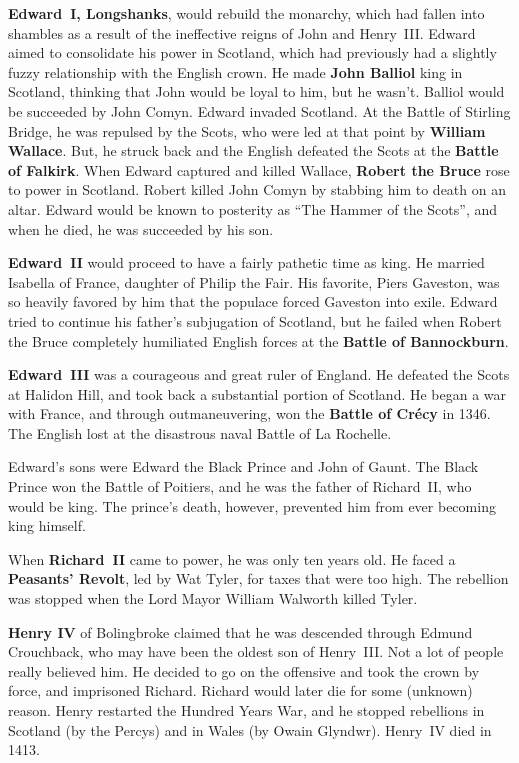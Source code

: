 \textbf{Edward~I, Longshanks}, would rebuild the monarchy,
which had fallen into shambles as a result of the ineffective reigns of John and Henry~III\@.
Edward aimed to consolidate his power in Scotland,
which had previously had a slightly fuzzy relationship with the English crown.
He made \textbf{John Balliol} king in Scotland, thinking that John would be loyal to him, but he wasn't.
Balliol would be succeeded by John Comyn.
Edward invaded Scotland.
At the Battle of Stirling Bridge, he was repulsed by the Scots,
who were led at that point by \textbf{William Wallace}.
But, he struck back and the English defeated the Scots at the \textbf{Battle of Falkirk}.
When Edward captured and killed Wallace, \textbf{Robert the Bruce} rose to power in Scotland.
Robert killed John Comyn by stabbing him to death on an altar.
Edward would be known to posterity as ``The Hammer of the Scots'',
and when he died, he was succeeded by his son.

\textbf{Edward~II} would proceed to have a fairly pathetic time as king.
He married Isabella of France, daughter of Philip the Fair.
His favorite, Piers Gaveston, was so heavily favored by him that the populace forced Gaveston into exile.
Edward tried to continue his father's subjugation of Scotland, but he failed
when Robert the Bruce completely humiliated English forces at the \textbf{Battle of Bannockburn}.

\textbf{Edward~III} was a courageous and great ruler of England.
He defeated the Scots at Halidon Hill, and took back a substantial portion of Scotland.
He began a war with France, and through outmaneuvering, won the \textbf{Battle of Cr\'ecy} in 1346.
The English lost at the disastrous naval Battle of La Rochelle.

Edward's sons were Edward the Black Prince and John of Gaunt.
The Black Prince won the Battle of Poitiers, and he was the father of Richard~II, who would be king.
The prince's death, however, prevented him from ever becoming king himself.

When \textbf{Richard~II} came to power, he was only ten years old.
He faced a \textbf{Peasants' Revolt}, led by Wat Tyler, for taxes that were too high.
The rebellion was stopped when the Lord Mayor William Walworth killed Tyler.

\textbf{Henry IV} of Bolingbroke claimed that he was descended through Edmund Crouchback,
who may have been the oldest son of Henry~III\@.
Not a lot of people really believed him.
He decided to go on the offensive and took the crown by force, and imprisoned Richard.
Richard would later die for some (unknown) reason.
Henry restarted the Hundred Years War, and he stopped rebellions
in Scotland (by the Percys) and in Wales (by Owain Glyndwr).
Henry~IV died in 1413.

